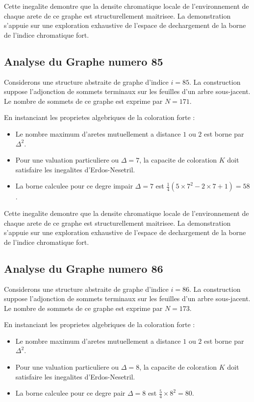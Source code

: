 \documentclass[11pt,a4paper]{article}
\begin{document}
Cette inegalite demontre que la densite chromatique locale de l'environnement de chaque arete de ce graphe est structurellement maitrisee. La demonstration s'appuie sur une exploration exhaustive de l'espace de dechargement de la borne de l'indice chromatique fort.

\subsection{Analyse du Graphe numero 85}
Considerons une structure abstraite de graphe d'indice $i = 85$. La construction suppose l'adjonction de sommets terminaux sur les feuilles d'un arbre sous-jacent. Le nombre de sommets de ce graphe est exprime par $N = 171$.

En instanciant les proprietes algebriques de la coloration forte :
\begin{itemize}
\item Le nombre maximum d'aretes mutuellement a distance $1$ ou $2$ est borne par $\Delta^2$.
\item Pour une valuation particuliere ou $\Delta = 7$, la capacite de coloration $K$ doit satisfaire les inegalites d'Erdos-Nesetril.
\item La borne calculee pour ce degre impair $\Delta = 7$ est $\frac{1}{4}(5 \times 7^2 - 2 \times 7 + 1) = 58$.
\end{itemize}

Cette inegalite demontre que la densite chromatique locale de l'environnement de chaque arete de ce graphe est structurellement maitrisee. La demonstration s'appuie sur une exploration exhaustive de l'espace de dechargement de la borne de l'indice chromatique fort.

\subsection{Analyse du Graphe numero 86}
Considerons une structure abstraite de graphe d'indice $i = 86$. La construction suppose l'adjonction de sommets terminaux sur les feuilles d'un arbre sous-jacent. Le nombre de sommets de ce graphe est exprime par $N = 173$.

En instanciant les proprietes algebriques de la coloration forte :
\begin{itemize}
\item Le nombre maximum d'aretes mutuellement a distance $1$ ou $2$ est borne par $\Delta^2$.
\item Pour une valuation particuliere ou $\Delta = 8$, la capacite de coloration $K$ doit satisfaire les inegalites d'Erdos-Nesetril.
\item La borne calculee pour ce degre pair $\Delta = 8$ est $\frac{5}{4} \times 8^2 = 80$.
\end{itemize}
\end{document}
